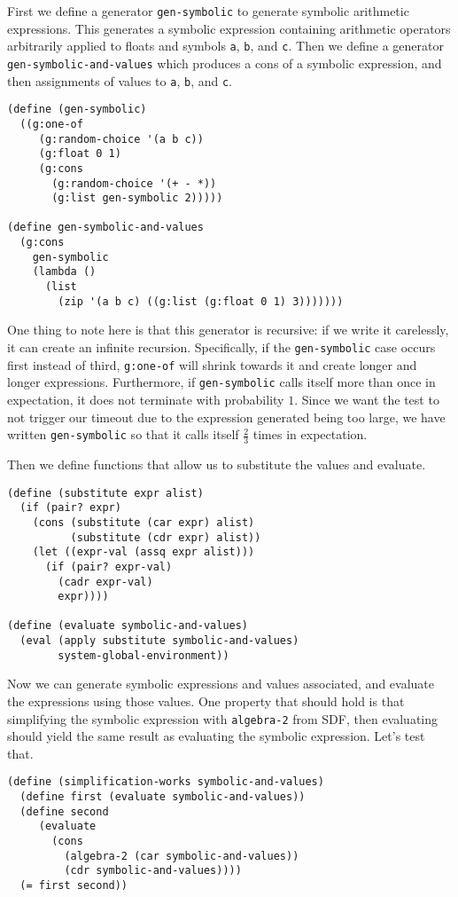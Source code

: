 First we define a generator \verb|gen-symbolic| to generate symbolic arithmetic expressions. This generates a symbolic expression containing arithmetic operators arbitrarily applied to floats and symbols \verb|a|, \verb|b|, and \verb|c|. Then we define a generator \verb|gen-symbolic-and-values| which produces a cons of a symbolic expression, and then assignments of values to \verb|a|, \verb|b|, and \verb|c|. 
\begin{lstlisting}
(define (gen-symbolic)
  ((g:one-of
     (g:random-choice '(a b c))
     (g:float 0 1)
     (g:cons
       (g:random-choice '(+ - *))
       (g:list gen-symbolic 2)))))

(define gen-symbolic-and-values
  (g:cons
    gen-symbolic
    (lambda ()
      (list
        (zip '(a b c) ((g:list (g:float 0 1) 3)))))))
\end{lstlisting}
One thing to note here is that this generator is recursive: if we write it carelessly, it can create an infinite recursion. Specifically, if the \verb|gen-symbolic| case occurs first instead of third, \verb|g:one-of| will shrink towards it and create longer and longer expressions. Furthermore, if \verb|gen-symbolic| calls itself more than once in expectation, it does not terminate with probability $1$. Since we want the test to not trigger our timeout due to the expression generated being too large, we have written \verb|gen-symbolic| so that it calls itself $\frac 23$ times in expectation.

Then we define functions that allow us to substitute the values and evaluate.

\begin{lstlisting}
(define (substitute expr alist)
  (if (pair? expr)
    (cons (substitute (car expr) alist)
          (substitute (cdr expr) alist))
    (let ((expr-val (assq expr alist)))
      (if (pair? expr-val)
        (cadr expr-val)
        expr))))

(define (evaluate symbolic-and-values)
  (eval (apply substitute symbolic-and-values) 
        system-global-environment))
\end{lstlisting}

Now we can generate symbolic expressions and values associated, and evaluate the expressions using those values. One property that should hold is that simplifying the symbolic expression with \verb|algebra-2| from SDF, then evaluating should yield the same result as evaluating the symbolic expression. Let's test that.

\begin{lstlisting}
(define (simplification-works symbolic-and-values)
  (define first (evaluate symbolic-and-values))
  (define second
     (evaluate
       (cons
         (algebra-2 (car symbolic-and-values))
         (cdr symbolic-and-values))))
  (= first second))
\end{lstlisting}

